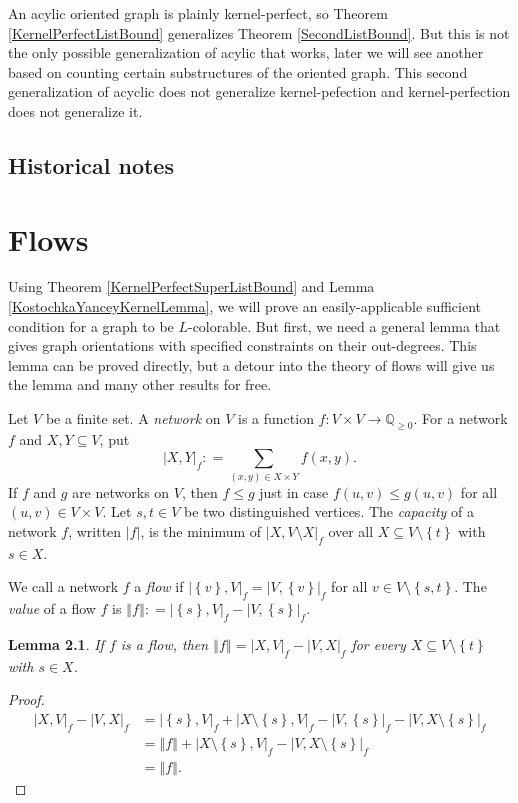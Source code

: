 \documentclass{tufte-book} %
\theoremstyle{plain}
\newtheorem{lemma}{Lemma}
\newcommand{\set}[1]{\left\{ #1 \right\}}
\newcommand{\card}[1]{\left|#1\right|}
\newcommand{\size}[1]{\left\Vert#1\right\Vert}
\newcommand{\func}[3]{#1\colon #2 \rightarrow #3}
\newcommand{\DefinedAs}{\mathrel{\mathop:}=}
\newcommand{\Q}{\mathbb{Q}}
\begin{document}
An acylic oriented graph is plainly kernel-perfect, so Theorem \ref{KernelPerfectListBound} generalizes Theorem \ref{SecondListBound}.  
But this is not the only possible generalization of acylic that works, later\marginnote{\textcolor{blue}{what chapter?}} we will see another based on counting certain substructures of the oriented graph. 
This second generalization of acyclic does not generalize kernel-pefection and kernel-perfection does not generalize it.

\section{Historical notes}

\chapter{Flows}
Using Theorem \ref{KernelPerfectSuperListBound} and Lemma \ref{KostochkaYanceyKernelLemma}, we will prove an easily-applicable sufficient condition for a graph to be $L$-colorable.  
But first, we need a general lemma that gives graph orientations with specified constraints on their out-degrees.  This lemma can be proved directly, 
but a detour into the theory of flows will give us the lemma and many other results for free.

Let $V$ be a finite set.  A \emph{network} on $V$ is a function $\func{f}{V\times V}{\Q_{\ge 0}}$.  For a network $f$ and $X,Y \subseteq V$, put
\[\card{X,Y}_f \DefinedAs \sum_{(x,y) \in X\times Y} f(x,y).\]
If $f$ and $g$ are networks on $V$, then $f \le g$ just in case $f(u,v) \le g(u,v)$ for all $(u,v)\in V\times V$.
Let $s,t \in V$ be two distinguished vertices.  The \emph{capacity} of a network $f$, written $\card{f}$, is the minimum of $\card{X, V\setminus X}_f$ over all $X \subseteq V\setminus\set{t}$ with $s \in X$.

We call a network $f$ a \emph{flow} if $\card{\set{v},V}_f = \card{V,\set{v}}_f$ for all $v \in V \setminus \set{s,t}$.
The \emph{value} of a flow $f$ is $\size{f} \DefinedAs \card{\set{s},V}_f - \card{V,\set{s}}_f$.

\begin{lemma}\label{FlowValues}
If $f$ is a flow, then $\size{f} = \card{X, V}_f - \card{V, X}_f$ for every $X \subseteq V\setminus\set{t}$ with $s \in X$.
\end{lemma}
\begin{proof}
\begin{align*}
\card{X, V}_f - \card{V, X}_f &= \card{\set{s}, V}_f + \card{X\setminus\set{s}, V}_f - \card{V, \set{s}}_f - \card{V, X\setminus\set{s}}_f\\
&= \size{f} + \card{X\setminus\set{s}, V}_f - \card{V, X\setminus\set{s}}_f\\
&= \size{f}.
\end{align*}
\end{proof}
\end{document}
